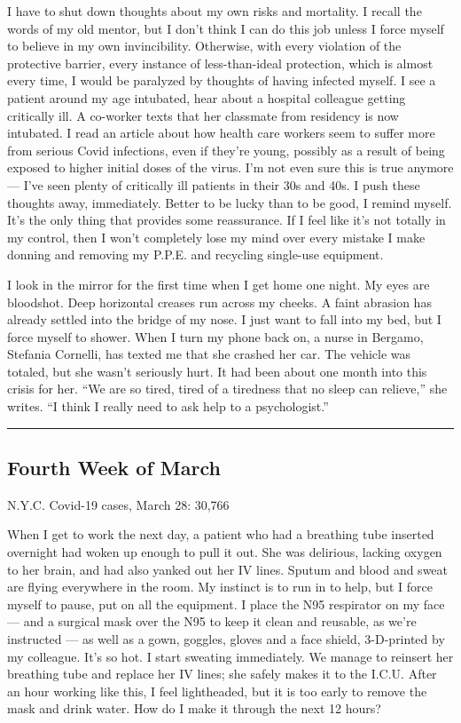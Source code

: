 I have to shut down thoughts about my own risks and mortality. I recall
the words of my old mentor, but I don't think I can do this job unless I
force myself to believe in my own invincibility. Otherwise, with every
violation of the protective barrier, every instance of less-than-ideal
protection, which is almost every time, I would be paralyzed by thoughts
of having infected myself. I see a patient around my age intubated, hear
about a hospital colleague getting critically ill. A co-worker texts
that her classmate from residency is now intubated. I read an article
about how health care workers seem to suffer more from serious Covid
infections, even if they're young, possibly as a result of being exposed
to higher initial doses of the virus. I'm not even sure this is true
anymore --- I've seen plenty of critically ill patients in their 30s and
40s. I push these thoughts away, immediately. Better to be lucky than to
be good, I remind myself. It's the only thing that provides some
reassurance. If I feel like it's not totally in my control, then I won't
completely lose my mind over every mistake I make donning and removing
my P.P.E. and recycling single-use equipment.

I look in the mirror for the first time when I get home one night. My
eyes are bloodshot. Deep horizontal creases run across my cheeks. A
faint abrasion has already settled into the bridge of my nose. I just
want to fall into my bed, but I force myself to shower. When I turn my
phone back on, a nurse in Bergamo, Stefania Cornelli, has texted me that
she crashed her car. The vehicle was totaled, but she wasn't seriously
hurt. It had been about one month into this crisis for her. ``We are so
tired, tired of a tiredness that no sleep can relieve,'' she writes. ``I
think I really need to ask help to a psychologist.''

\begin{center}\rule{0.5\linewidth}{\linethickness}\end{center}

\hypertarget{fourth-week-of-march-3}{%
\subsection{Fourth Week of March}\label{fourth-week-of-march-3}}

N.Y.C. Covid-19 cases, March 28: 30,766

When I get to work the next day, a patient who had a breathing tube
inserted overnight had woken up enough to pull it out. She was
delirious, lacking oxygen to her brain, and had also yanked out her IV
lines. Sputum and blood and sweat are flying everywhere in the room. My
instinct is to run in to help, but I force myself to pause, put on all
the equipment. I place the N95 respirator on my face --- and a surgical
mask over the N95 to keep it clean and reusable, as we're instructed ---
as well as a gown, goggles, gloves and a face shield, 3-D-printed by my
colleague. It's so hot. I start sweating immediately. We manage to
reinsert her breathing tube and replace her IV lines; she safely makes
it to the I.C.U. After an hour working like this, I feel lightheaded,
but it is too early to remove the mask and drink water. How do I make it
through the next 12 hours?

